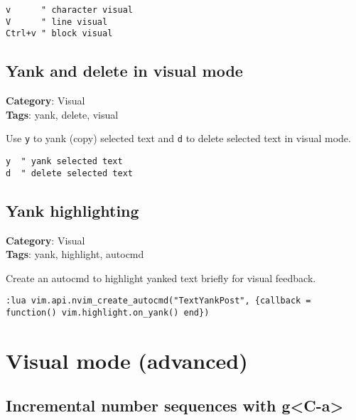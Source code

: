 {{{{{{{{{{{{{{{{{{\begin{Exa*}{}
\begin{Verbatim}[fontsize=\footnotesize, breaklines, breakanywhere]
v      " character visual
V      " line visual
Ctrl+v " block visual
\end{Verbatim}
\end{Exa*}

\section{Yank and delete in visual mode}

\textbf{Category}: Visual\\ \textbf{Tags}: yank, delete, visual
\vspace{0.5cm}

Use {\footnotesize \Verb§y§} to yank (copy) selected text and {\footnotesize \Verb§d§} to delete selected text in visual mode.

\begin{Exa*}{}
\begin{Verbatim}[fontsize=\footnotesize, breaklines, breakanywhere]
y  " yank selected text
d  " delete selected text
\end{Verbatim}
\end{Exa*}

\section{Yank highlighting}

\textbf{Category}: Visual\\ \textbf{Tags}: yank, highlight, autocmd
\vspace{0.5cm}

Create an autocmd to highlight yanked text briefly for visual feedback.

\begin{Exa*}{}
\begin{Verbatim}[fontsize=\footnotesize, breaklines, breakanywhere]
:lua vim.api.nvim_create_autocmd("TextYankPost", {callback = function() vim.highlight.on_yank() end})
\end{Verbatim}
\end{Exa*}

\chapter{Visual mode (advanced)}
\section{Incremental number sequences with g<C-a>}

}}}}}}}}}}}}}}}}}}
